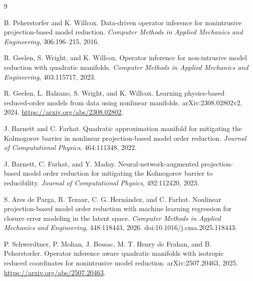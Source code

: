 \documentclass[11pt]{article}
\begin{document}
\begin{thebibliography}{9}

B. Peherstorfer and K. Willcox.
\newblock Data-driven operator inference for nonintrusive projection-based
model reduction.
\newblock \emph{Computer Methods in Applied Mechanics and Engineering},
306:196--215, 2016.

R. Geelen, S. Wright, and K. Willcox.
\newblock Operator inference for non-intrusive model reduction with quadratic
manifolds.
\newblock \emph{Computer Methods in Applied Mechanics and Engineering},
403:115717, 2023.

R. Geelen, L. Balzano, S. Wright, and K. Willcox.
\newblock Learning physics-based reduced-order models from data using nonlinear
manifolds.
\newblock arXiv:2308.02802v2, 2024.
\newblock \url{https://arxiv.org/abs/2308.02802}.

J. Barnett and C. Farhat.
\newblock Quadratic approximation manifold for mitigating the Kolmogorov
barrier in nonlinear projection-based model order reduction.
\newblock \emph{Journal of Computational Physics}, 464:111348, 2022.

J. Barnett, C. Farhat, and Y. Maday.
\newblock Neural-network-augmented projection-based model order reduction for
mitigating the Kolmogorov barrier to reducibility.
\newblock \emph{Journal of Computational Physics}, 492:112420, 2023.

S. Ares de Parga, R. Tezaur, C. G. Hern\'{a}ndez, and C. Farhat.
\newblock Nonlinear projection-based model order reduction with machine
learning regression for closure error modeling in the latent space.
\newblock \emph{Computer Methods in Applied Mechanics and Engineering},
448:118443, 2026.
\newblock doi:10.1016/j.cma.2025.118443.

P. Schwerdtner, P. Mohan, J. Bessac, M. T. Henry de Frahan, and
B. Peherstorfer.
\newblock Operator inference aware quadratic manifolds with isotropic reduced
coordinates for nonintrusive model reduction.
\newblock arXiv:2507.20463, 2025.
\newblock \url{https://arxiv.org/abs/2507.20463}.

\end{thebibliography}
\end{document}
